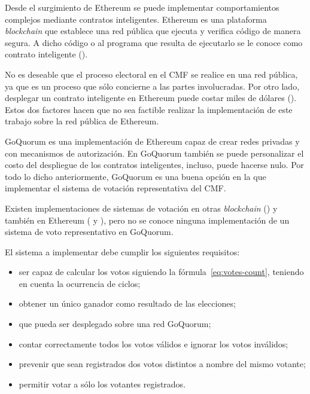 
Desde el surgimiento de Ethereum se puede implementar comportamientos complejos mediante contratos inteligentes. Ethereum es una plataforma \textit{blockchain} que establece una red p\'ublica que ejecuta y verifica c\'odigo de manera segura. A dicho c\'odigo o al programa que resulta de ejecutarlo se le conoce como contrato inteligente (\cite{eth-aws}).  

No es deseable que el proceso electoral en el CMF se realice en una red p\'ublica, ya que es un proceso que s\'olo concierne a las partes involucradas. Por otro lado, desplegar un contrato inteligente en Ethereum puede costar miles de d\'olares (\cite{eth-deploy}). Estos dos factores hacen que no sea factible realizar la implementaci\'on de este trabajo sobre la red p\'ublica de Ethereum. 

GoQuorum es una implementaci\'on de Ethereum capaz de crear redes privadas y con mecanismos de autorizaci\'on. En GoQuorum tambi\'en se puede personalizar el costo del despliegue de los contratos inteligentes, incluso, puede hacerse nulo. Por todo lo dicho anteriormente, GoQuorum es una buena opci\'on en la que implementar el sistema de votaci\'on representativa del CMF.


Existen implementaciones de sistemas de votaci\'on en otras \textit{blockchain} (\cite{agora}) y tambi\'en en Ethereum (\cite{ovn} y \cite{borda_count}), pero no se conoce ninguna implementaci\'on de un sistema de voto representativo en GoQuorum.

El sistema a implementar debe cumplir los siguientes requisitos:
\begin{itemize}
    \item ser capaz de calcular los votos siguiendo la f\'ormula~\eqref{eq:votes-count}, teniendo en cuenta la ocurrencia de ciclos;
    \item obtener un \'unico ganador como resultado de las elecciones;
    \item que pueda ser desplegado sobre una red GoQuorum;
    \item contar correctamente todos los votos v\'alidos e ignorar los votos inv\'alidos;
    \item prevenir que sean registrados dos votos distintos a nombre del mismo votante;
    \item permitir votar a s\'olo los votantes registrados.
\end{itemize}


